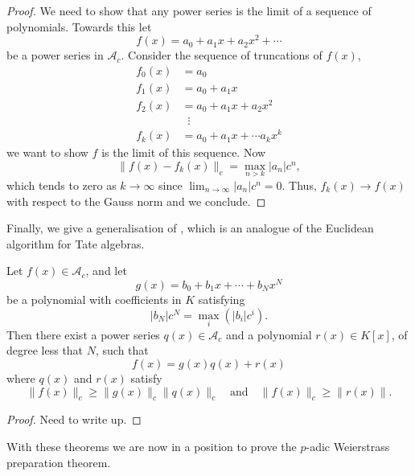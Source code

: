 \begin{proof}
    We need to show that any power series is the limit of a sequence of polynomials. Towards this
    let
    \[
    f(x) = a_0 + a_1x+a_2x^2 + \cdots
    \]
    be a power series in $\mathcal{A}_c$.
    Consider the sequence of truncations of $f(x)$,
    \begin{align*}
        f_0(x) &= a_0 \\
        f_1(x) &= a_0 + a_1 x \\
        f_2(x) &= a_0 + a_1 x + a_2 x^2 \\
        & \; \; \vdots \\
        f_k(x) &= a_0 + a_1 x + \cdots a_k x^k
    \end{align*}
    we want to show $f$ is the limit of this sequence. Now
    \[
    \| f(x) - f_k (x) \|_c = \max_{n>k} |a_n|c^n,
    \]
    which tends to zero as $k \to \infty$ since $\lim_{n \to \infty} |a_n|c^n = 0$. Thus,
    $f_k (x) \to f(x)$ with respect to the Gauss norm and we conclude.
\end{proof}

Finally, we give a generalisation of \cite[Lemma~7.2.9]{Gouvea}, which is an analogue of the
Euclidean algorithm for Tate algebras.

\begin{lemma} \label{euclidalgoritheorem}
    Let $f(x) \in \mathcal{A}_c$, and let
    \[
    g(x) = b_0 + b_1 x + \cdots + b_N x^N
    \]
    be a polynomial with coefficients in $K$ satisfying
    \[
    \lvert b_N \rvert  c^N= \max_i (\lvert b_i \rvert c^i).
    \]
    Then there exist a power series $q(x) \in \mathcal{A}_c$ and a polynomial $r(x) \in K[x]$,
    of degree less that $N$, such that
    \[
    f(x) = g(x) q(x) + r(x)
    \]
    where $q(x)$ and $r(x)$ satisfy
    \[
    \|f(x) \|_c \geq \|g(x)\|_c \| q(x)\|_c \quad \text{and} \quad \|f(x) \|_c \geq \| r(x) \|.
    \]
    \end{lemma}

\begin{proof}
    Need to write up.
\end{proof}

With these theorems we are now in a position to prove the $p$-adic Weierstrass preparation theorem.

